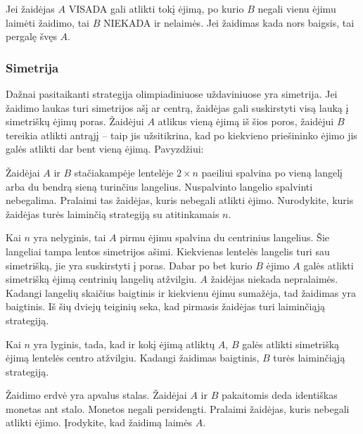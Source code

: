 Jei žaidėjas $A$ VISADA gali atlikti tokį ėjimą, po kurio $B$ negali vienu
ėjimu laimėti žaidimo, tai $B$ NIEKADA ir nelaimės. Jei žaidimas kada nors
baigsis, tai pergalę švęs $A$. 

\subsubsection{Simetrija}

Dažnai pasitaikanti strategija olimpiadiniuose uždaviniuose yra simetrija.
Jei žaidimo laukas turi simetrijos ašį ar centrą, žaidėjas gali suskirstyti
visą lauką į simetriškų ėjimų poras. Žaidėjui $A$ atlikus vieną ėjimą iš šios
poros, žaidėjui $B$ tereikia atlikti antrąjį -- taip jis užsitikrina, kad po
kiekvieno priešininko ėjimo jis galės atlikti dar bent vieną ėjimą.
Pavyzdžiui:

\begin{pavnr}
  Žaidėjai $A$ ir $B$ stačiakampėje lentelėje $ 2\times n$ paeiliui spalvina po
  vieną langelį arba du bendrą sieną turinčius langelius. Nuspalvinto
  langelio spalvinti nebegalima. Pralaimi tas žaidėjas, kuris nebegali
  atlikti ėjimo. Nurodykite, kuris žaidėjas turės laiminčią strategiją su
  atitinkamais $n$. 
\end{pavnr}

\begin{sprendimas}
  Kai $n$ yra nelyginis, tai $A$ pirmu ėjimu spalvina du centrinius
  langelius. Šie langeliai tampa lentos simetrijos ašimi. Kiekvienas lentelės
  langelis turi sau simetrišką, jie yra suskirstyti į poras. Dabar po bet
  kurio $B$ ėjimo $A$ galės atlikti simetrišką ėjimą centrinių langelių
  atžvilgiu. $A$ žaidėjas niekada nepralaimės. Kadangi langelių skaičius
  baigtinis ir kiekvienu ėjimu sumažėja, tad žaidimas yra baigtinis. Iš šių
  dviejų teiginių seka, kad pirmasis žaidėjas turi laiminčiąją strategiją. 

  Kai $n$ yra lyginis, tada, kad ir kokį ėjimą atliktų $A$, $B$ galės atlikti
  simetrišką ėjimą lentelės centro atžvilgiu. Kadangi žaidimas baigtinis,
  $B$ turės laiminčiąją strategiją. 
\end{sprendimas}

\begin{pavnr}
  Žaidimo erdvė yra apvalus stalas. Žaidėjai $A$ ir $B$ pakaitomis deda
  identiškas monetas ant stalo. Monetos negali persidengti. Pralaimi
  žaidėjas, kuris nebegali atlikti ėjimo. Įrodykite, kad žaidimą laimės $A$. 
\end{pavnr}

